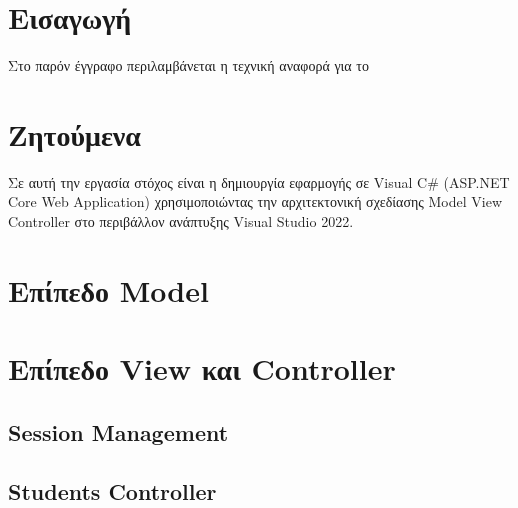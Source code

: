 \documentclass[12pt]{article}
\begin{document}
\begin{titlepage}
		
		
		
		
		\vfill %
		
	\end{titlepage}
	
	
	
	\tableofcontents
	
	 \newpage
	
	 \section{Εισαγωγή}
	 Στο παρόν έγγραφο περιλαμβάνεται η τεχνική αναφορά για το
	
	 \newpage
	
	
	
	\section{Ζητούμενα}
	
	Σε αυτή την εργασία στόχος είναι η δημιουργία εφαρμογής σε Visual C\# (ASP.NET Core Web Application) χρησιμοποιώντας την αρχιτεκτονική σχεδίασης Model View Controller στο περιβάλλον ανάπτυξης Visual Studio 2022.
	


	\section{Επίπεδο Model}
	
	\section{Επίπεδο View και Controller}
	
	\subsection{Session Management}

	\subsection{Students Controller}
	
\end{document}
